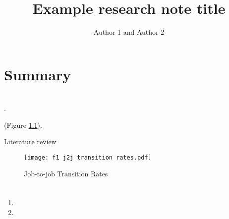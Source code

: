 \documentclass[11pt,twocolumn,openany,leqno]{e61-research-note}
\begin{document}
\emergencystretch=5pt
\baselineskip=15pt
\sloppy

\title{Example research note title}


\author{Author 1 and Author 2}

\maketitle

\chapter*{Summary}

\begin{abstract}

\lipsum[1-2]

\end{abstract}

\chapter{\lipsum[][1]}

\lipsum[1] \parencite{Adams22}.

\lipsum[2] (Figure \ref{fig:j2j-agg}). 

\newpage

\begin{Boxx}[label=b1]{Literature review}
\begin{small}
\setlength{\parindent}{15pt}
\lipsum[3-4]
\end{small}
\end{Boxx}

\begin{figure}[htb]
\caption{Job-to-job Transition Rates}\label{fig:j2j-agg}
\texttt{[image: f1 j2j transition rates.pdf]}
\end{figure}

\chapter{\lipsum[][2]}

\lipsum[][1]
\begin{enumerate}
  \item \lipsum[][4]
  \item \lipsum[][5]
\end{enumerate}
\end{document}
